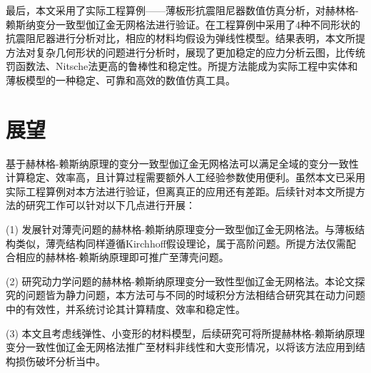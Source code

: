 最后，本文采用了实际工程算例——薄板形抗震阻尼器数值仿真分析，对赫林格-赖斯纳变分一致型伽辽金无网格法进行验证。在工程算例中采用了4种不同形状的抗震阻尼器进行分析对比，相应的材料均假设为弹线性模型。结果表明，本文所提方法对复杂几何形状的问题进行分析时，展现了更加稳定的应力分析云图，比传统罚函数法、Nitsche法更高的鲁棒性和稳定性。所提方法能成为实际工程中实体和薄板模型的一种稳定、可靠和高效的数值仿真工具。

\section{展望}
基于赫林格-赖斯纳原理的变分一致型伽辽金无网格法可以满足全域的变分一致性计算稳定、效率高，且计算过程需要额外人工经验参数使用便利。虽然本文已采用实际工程算例对本方法进行验证，但离真正的应用还有差距。后续针对本文所提方法的研究工作可以针对以下几点进行开展：

(1) 发展针对薄壳问题的赫林格-赖斯纳原理变分一致型伽辽金无网格法。与薄板结构类似，薄壳结构同样遵循Kirchhoff假设理论，属于高阶问题。所提方法仅需配合相应的赫林格-赖斯纳原理即可推广至薄壳问题。

(2) 研究动力学问题的赫林格-赖斯纳原理变分一致性型伽辽金无网格法。本论文探究的问题皆为静力问题，本方法可与不同的时域积分方法相结合研究其在动力问题中的有效性，并系统讨论其计算精度、效率和稳定性。

(3) 本文且考虑线弹性、小变形的材料模型，后续研究可将所提赫林格-赖斯纳原理变分一致性伽辽金无网格法推广至材料非线性和大变形情况，以将该方法应用到结构损伤破坏分析当中。
